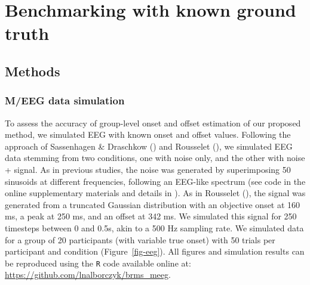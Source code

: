 \documentclass[
  doc,
  floatsintext,
  longtable,
  a4paper,
  nolmodern,
  notxfonts,
  notimes,
  colorlinks=true,linkcolor=blue,citecolor=blue,urlcolor=blue]{apa7}
\begin{document}
\section{Benchmarking with known ground
truth}\label{benchmarking-with-known-ground-truth}

\subsection{Methods}\label{methods}

\subsubsection{M/EEG data simulation}\label{meeg-data-simulation}

To assess the accuracy of group-level onset and offset estimation of our
proposed method, we simulated EEG with known onset and offset values.
Following the approach of Sassenhagen \& Draschkow
() and Rousselet
(), we simulated EEG data
stemming from two conditions, one with noise only, and the other with
noise + signal. As in previous studies, the noise was generated by
superimposing 50 sinusoids at different frequencies, following an
EEG-like spectrum (see code in the online supplementary materials and
details in ). As in
Rousselet (), the signal was
generated from a truncated Gaussian distribution with an objective onset
at 160 ms, a peak at 250 ms, and an offset at 342 ms. We simulated this
signal for 250 timesteps between 0 and 0.5s, akin to a 500 Hz sampling
rate. We simulated data for a group of 20 participants (with variable
true onset) with 50 trials per participant and condition
(Figure~\ref{fig-eeg}). All figures and simulation results can be
reproduced using the \texttt{R} code available online at:
\url{https://github.com/lnalborczyk/brms_meeg}.
\end{document}
